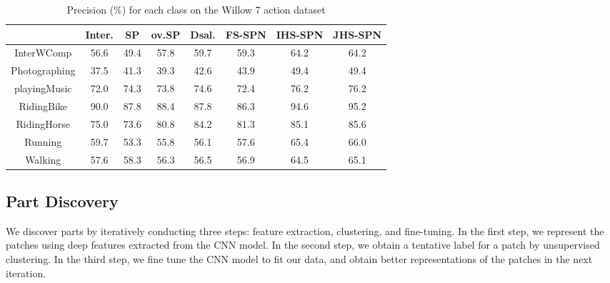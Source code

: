 \documentclass[journal]{IEEEtran}
\begin{document}
\begin{table*}[htb]
    \caption{Precision (\%) for each class on the Willow 7 action dataset}

    \begin{center}

        \begin{tabular}{c c c c c c c c}
            \hline
            \hline
             & Inter.\cite{Delaitre11learningperson-object} &  SP\cite{Lazebnik_beyond_cvpr2006} & ov.SP\cite{Lazebnik_beyond_cvpr2006}  & Dsal.\cite{sharma:CVPR2012_Discriminative}  & FS-SPN & IHS-SPN & JHS-SPN \\ \hline
               InterWComp & 56.6 & 49.4 & 57.8 & 59.7 & 59.3 & 64.2 & 64.2\\
            Photographing & 37.5 &  41.3 & 39.3 & 42.6 & 43.9 & 49.4 & 49.4\\
            playingMusic & 72.0 & 74.3 & 73.8 & 74.6 & 72.4 & 76.2 & 76.2\\
            RidingBike & 90.0 & 87.8 & 88.4 & 87.8 & 86.3 & 94.6 & 95.2\\
            RidingHorse & 75.0 & 73.6 & 80.8 & 84.2 & 81.3 & 85.1 & 85.6\\
            Running & 59.7 &  53.3 & 55.8 & 56.1 & 57.6 & 65.4 & 66.0\\
            Walking & 57.6 & 58.3 & 56.3 & 56.5 & 56.9 & 64.5 & 65.1\\
            \hline

                        \hline
       \end{tabular}

    \end{center}


    \label{tab:class_willow_accuracy}
\end{table*}









\subsection{Part Discovery}

We discover parts by iteratively conducting three steps: feature extraction, clustering, and fine-tuning. In the first step, we represent the patches using deep features extracted from the CNN model. In the second step, we obtain a tentative label for a patch by unsupervised clustering. In the third step, we fine tune the CNN model to fit our data, and obtain better representations of the patches in the next iteration.
\end{document}
